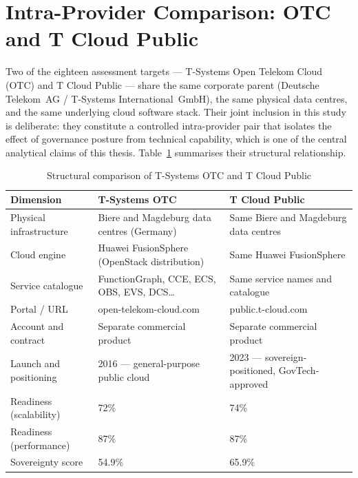 \section{Intra-Provider Comparison: OTC and T Cloud Public}
\label{sec:otc_tcp_comparison}

Two of the eighteen assessment targets — T-Systems Open Telekom Cloud (OTC) and T Cloud Public — share the same corporate parent (Deutsche Telekom~AG / T-Systems International~GmbH), the same physical data centres, and the same underlying cloud software stack. Their joint inclusion in this study is deliberate: they constitute a controlled intra-provider pair that isolates the effect of governance posture from technical capability, which is one of the central analytical claims of this thesis. Table~\ref{tab:otc_tcp_comparison} summarises their structural relationship.

\begin{table}[htbp]
\centering
\caption{Structural comparison of T-Systems OTC and T Cloud Public}
\label{tab:otc_tcp_comparison}
\begin{tabularx}{\linewidth}{lXX}
\toprule
\textbf{Dimension} & \textbf{T-Systems OTC} & \textbf{T Cloud Public} \\
\midrule
Physical infrastructure   & Biere and Magdeburg data centres (Germany) & Same Biere and Magdeburg data centres \\
Cloud engine              & Huawei FusionSphere (OpenStack distribution) & Same Huawei FusionSphere \\
Service catalogue         & FunctionGraph, CCE, ECS, OBS, EVS, DCS\ldots & Same service names and catalogue \\
Portal / URL              & open-telekom-cloud.com & public.t-cloud.com \\
Account and contract      & Separate commercial product & Separate commercial product \\
Launch and positioning    & 2016 — general-purpose public cloud & 2023 — sovereign-positioned, GovTech-approved \\
Readiness (scalability)   & 72\% & 74\% \\
Readiness (performance)   & 87\% & 87\% \\
Sovereignty score         & 54.9\% & 65.9\% \\
\bottomrule
\end{tabularx}
\end{table}

